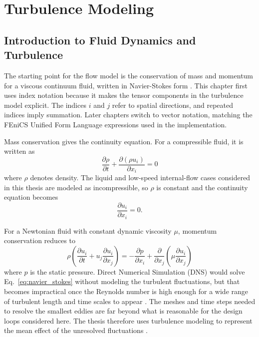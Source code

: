 \chapter{Turbulence Modeling}
\label{ch:turbulence_modeling}

\section{Introduction to Fluid Dynamics and Turbulence}
The starting point for the flow model is the conservation of mass and momentum for a viscous continuum fluid, written in Navier-Stokes form \cite{White2006}. This chapter first uses index notation because it makes the tensor components in the turbulence model explicit. The indices $i$ and $j$ refer to spatial directions, and repeated indices imply summation. Later chapters switch to vector notation, matching the FEniCS Unified Form Language expressions used in the implementation.

Mass conservation gives the continuity equation. For a compressible fluid, it is written as
\begin{equation}
	\frac{\partial \rho}{\partial t} + \frac{\partial (\rho u_i)}{\partial x_i} = 0
\end{equation}
where $\rho$ denotes density. The liquid and low-speed internal-flow cases considered in this thesis are modeled as incompressible, so $\rho$ is constant and the continuity equation becomes
\begin{equation}
	\frac{\partial u_i}{\partial x_i} = 0 .
	\label{eq:continuity}
\end{equation}

For a Newtonian fluid with constant dynamic viscosity $\mu$, momentum conservation reduces to
\begin{equation}
	\rho \left( \frac{\partial u_i}{\partial t} + u_j \frac{\partial u_i}{\partial x_j} \right) = -\frac{\partial p}{\partial x_i} + \frac{\partial}{\partial x_j} \left( \mu \frac{\partial u_i}{\partial x_j} \right)
	\label{eq:navier_stokes}
\end{equation}
where $p$ is the static pressure. Direct Numerical Simulation (DNS) would solve Eq.~\ref{eq:navier_stokes} without modeling the turbulent fluctuations, but that becomes impractical once the Reynolds number is high enough for a wide range of turbulent length and time scales to appear \cite{Pope2000}. The meshes and time steps needed to resolve the smallest eddies are far beyond what is reasonable for the design loops considered here. The thesis therefore uses turbulence modeling to represent the mean effect of the unresolved fluctuations \cite{Versteeg2007,Altair}.

